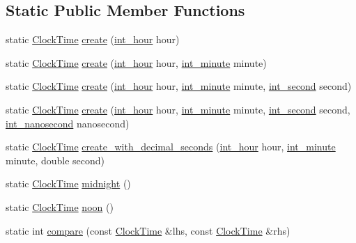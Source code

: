 \subsection*{\-Static \-Public \-Member \-Functions}
\begin{DoxyCompactItemize}
\item 
static \hyperlink{structClockTime}{\-Clock\-Time} \hyperlink{structClockTime_a72284f0c4f53d026688e55cea607f219}{create} (\hyperlink{types_8h_afc81a27a9c08f0790f17b34bdf95cdb7}{int\-\_\-hour} hour)
\item 
static \hyperlink{structClockTime}{\-Clock\-Time} \hyperlink{structClockTime_aa4429a92963b67343bc6eab885938a5a}{create} (\hyperlink{types_8h_afc81a27a9c08f0790f17b34bdf95cdb7}{int\-\_\-hour} hour, \hyperlink{types_8h_ae648329a919e6d860ef5ef2aac4ffb86}{int\-\_\-minute} minute)
\item 
static \hyperlink{structClockTime}{\-Clock\-Time} \hyperlink{structClockTime_a3a34039699358c31a6f68d545f228728}{create} (\hyperlink{types_8h_afc81a27a9c08f0790f17b34bdf95cdb7}{int\-\_\-hour} hour, \hyperlink{types_8h_ae648329a919e6d860ef5ef2aac4ffb86}{int\-\_\-minute} minute, \hyperlink{types_8h_acdee90940aea1c6f3e71652fb525a987}{int\-\_\-second} second)
\item 
static \hyperlink{structClockTime}{\-Clock\-Time} \hyperlink{structClockTime_afdf4e7a0b63e536f24a5eb85a3eb1ae8}{create} (\hyperlink{types_8h_afc81a27a9c08f0790f17b34bdf95cdb7}{int\-\_\-hour} hour, \hyperlink{types_8h_ae648329a919e6d860ef5ef2aac4ffb86}{int\-\_\-minute} minute, \hyperlink{types_8h_acdee90940aea1c6f3e71652fb525a987}{int\-\_\-second} second, \hyperlink{types_8h_a2a3f766e7346eb6ae01022cd28128ea6}{int\-\_\-nanosecond} nanosecond)
\item 
static \hyperlink{structClockTime}{\-Clock\-Time} \hyperlink{structClockTime_a71e4e398da2cb0cfd3adb3f87cb6f3c2}{create\-\_\-with\-\_\-decimal\-\_\-seconds} (\hyperlink{types_8h_afc81a27a9c08f0790f17b34bdf95cdb7}{int\-\_\-hour} hour, \hyperlink{types_8h_ae648329a919e6d860ef5ef2aac4ffb86}{int\-\_\-minute} minute, double second)
\item 
static \hyperlink{structClockTime}{\-Clock\-Time} \hyperlink{structClockTime_a7baab35d60ad3a2236c14133d8d0083b}{midnight} ()
\item 
static \hyperlink{structClockTime}{\-Clock\-Time} \hyperlink{structClockTime_ae206b86808ff1d0158cbc920eb289797}{noon} ()
\item 
static int \hyperlink{structClockTime_a4c185648dcfc28f46ac3fc700b3415c2}{compare} (const \hyperlink{structClockTime}{\-Clock\-Time} \&lhs, const \hyperlink{structClockTime}{\-Clock\-Time} \&rhs)
\end{DoxyCompactItemize}
